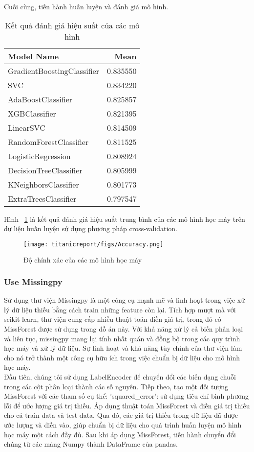 \documentclass[11pt]{article}
\begin{document}
Cuối cùng, tiến hành huấn luyện và đánh giá mô hình.
\begin{table}[htbp]
\centering
\caption{Kết quả đánh giá hiệu suất của các mô hình}
\label{tab:model_evaluation}
\begin{tabular}{|l|r|}
\hline
\textbf{Model Name} & \textbf{Mean} \\
\hline
GradientBoostingClassifier & 0.835550 \\
SVC & 0.834220 \\
AdaBoostClassifier & 0.825857 \\
XGBClassifier & 0.821395 \\
LinearSVC & 0.814509 \\
RandomForestClassifier & 0.811525 \\
LogisticRegression & 0.808924 \\
DecisionTreeClassifier & 0.805999 \\
KNeighborsClassifier & 0.801773 \\
ExtraTreesClassifier & 0.797547 \\
\hline
\end{tabular}
\end{table}
 Hình ~\ref{fig: Accuracy}  là kết quả đánh giá hiệu suất trung bình của các mô hình học máy trên dữ liệu huấn luyện sử dụng phương pháp cross-validation. 
\begin{figure}[ht]
    \centering
    \texttt{[image: titanicreport/figs/Accuracy.png]}
    \caption{Độ chính xác của các mô hình học máy}
    \label{fig: Accuracy}
\end{figure}
\subsubsection{ Use Missingpy}
Sử dụng thư viện Missingpy là một công cụ mạnh mẽ và linh hoạt trong việc xử lý dữ liệu thiếu bằng cách train những feature còn lại. Tích hợp mượt mà với scikit-learn, thư viện cung cấp nhiều thuật toán điền giá trị, trong đó có MissForest được sử dụng trong đồ án này. Với khả năng xử lý cả biến phân loại và liên tục, missingpy mang lại tính nhất quán và đồng bộ trong các quy trình học máy và xử lý dữ liệu. Sự linh hoạt và khả năng tùy chỉnh của thư viện làm cho nó trở thành một công cụ hữu ích trong việc chuẩn bị dữ liệu cho mô hình học máy. \\
Đầu tiên, chúng tôi sử dụng LabelEncoder để chuyển đổi các biến dạng chuỗi trong các cột phân loại thành các số nguyên. Tiếp theo, tạo một đối tượng MissForest với các tham số cụ thể: 'squared\_error': sử dụng tiêu chí bình phương lỗi để ước lượng giá trị thiếu. Áp dụng thuật toán MissForest và điền giá trị thiếu cho cả train data và test data. Qua đó, các giá trị thiếu trong dữ liệu đã được ước lượng và điền vào, giúp chuẩn bị dữ liệu cho quá trình huấn luyện mô hình học máy một cách đầy đủ. Sau khi áp dụng MissForest, tiến hành chuyển đổi chúng từ các mảng Numpy thành DataFrame của pandas. 
\end{document}
